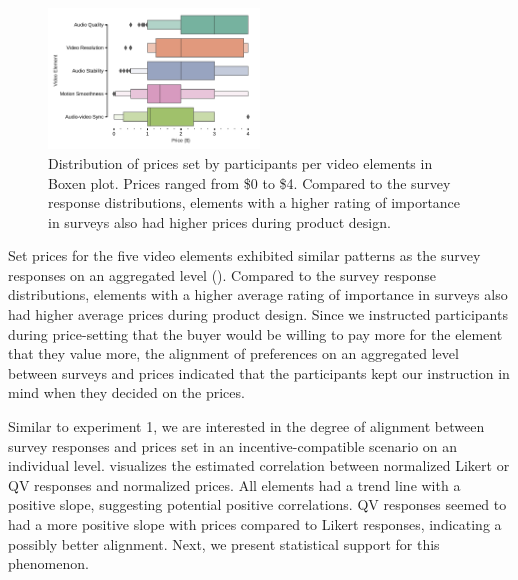 \begin{figure}[h]
    \centering
    \includegraphics[width=0.5\textwidth, keepaspectratio=true]{content/image/price_distribution_per_element.pdf}
    \caption{
      Distribution of prices set by participants per video elements in Boxen plot. 
      Prices ranged from \$0 to \$4. Compared to the survey response distributions, elements with a higher rating of importance in surveys also had higher prices during product design.
    }
    \label{fig:price_exp2}
\end{figure}


Set prices for the five video elements exhibited similar patterns as the survey responses on an aggregated level (). Compared to the survey response distributions, elements with a higher average rating of importance in surveys also had higher average prices during product design. Since we instructed participants during price-setting that the buyer would be willing to pay more for the element that they value more, the alignment of preferences on an aggregated level between surveys and prices indicated that the participants kept our instruction in mind when they decided on the prices.


Similar to experiment 1, we are interested in the degree of alignment between survey responses and prices set in an incentive-compatible scenario on an individual level.  visualizes the estimated correlation between normalized Likert or QV responses and normalized prices. All elements had a trend line with a positive slope, suggesting potential positive correlations. QV responses seemed to had a more positive slope with prices compared to Likert responses, indicating a possibly better alignment. Next, we present statistical support for this phenomenon.

